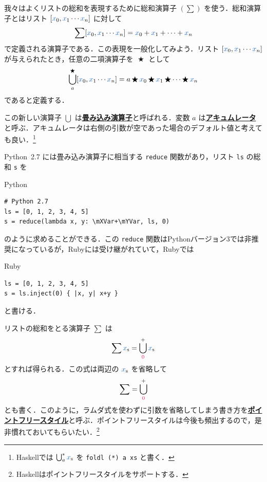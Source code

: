 \documentclass[a5paper,twoside,fleqn,draft]{jsbook}
\def\constantColor{WildStrawberry}
\def\varColor{NavyBlue}
\newcommand{\programminglanguage}[1]{\textsf{#1}}
\newcommand{\haskell}{\programminglanguage{Haskell}}
\newcommand{\python}{\programminglanguage{Python}}
\newcommand{\ruby}{\programminglanguage{Ruby}}
\newcommand{\keyword}[1]{{\underline{\textbf{#1}}}}
\newcommand{\code}[1]{\texttt{#1}}
\newenvironment{pythoncode}{\begin{itembox}[r]{\python}}{\end{itembox}}
\newenvironment{rubycode}{\begin{itembox}[r]{\ruby}}{\end{itembox}}
\newcommand{\mConstant}[1]{\textcolor{\constantColor}{#1}}
\newcommand{\mZeroNumber}{{\mConstant{0}}}
\newcommand{\mVar}[1]{\textcolor{\varColor}{#1}}
\newcommand{\mXVar}{\mVar{x}}
\newcommand{\mYVar}{\mVar{y}}
\DeclareMathOperator{\mBinOp}{\bigstar}
\DeclareMathOperator*{\mFold}{\bigcup}
\newcommand{\mList}[1]{\mVar{#1}_\mathrm{s}}
\begin{document}
我々はよくリストの総和を表現するために総和演算子 $(\sum)$ を使う．総和演算子とはリスト $[\mXVar_0,\mXVar_1\dotsb\mXVar_n]$ に対して
\begin{equation}
  \sum[\mXVar_0,\mXVar_1\dotsb \mXVar_n]
  =\mXVar_0+\mXVar_1+\dotsb+\mXVar_n
\end{equation}
で定義される演算子である．この表現を一般化してみよう．リスト $[\mXVar_0,\mXVar_1\dotsb \mXVar_n]$ が与えられたとき，任意の二項演算子を $\mBinOp$ として
\begin{equation}
  \mFold^{\mBinOp}_a[\mXVar_0,\mXVar_1\dotsb \mXVar_n]
  =a\mBinOp \mXVar_0\mBinOp \mXVar_1\mBinOp\dotsb\mBinOp \mXVar_n
\end{equation}
であると定義する．

この新しい演算子 $\mFold$ は\keyword{畳み込み演算子}と呼ばれる．変数 $a$ は\keyword{アキュムレータ}と呼ぶ．アキュムレータは右側の引数が空であった場合のデフォルト値と考えても良い．\footnote{\haskell では $\mFold^*_a\mList{x}$ を \code{foldl (*) a xs} と書く．}

\python\ 2.7 には畳み込み演算子に相当する \code{reduce} 関数があり，リスト \code{ls} の総和 \code{s} を
\begin{pythoncode}
\begin{verbatim}
# Python 2.7
ls = [0, 1, 2, 3, 4, 5]
s = reduce(lambda x, y: \mXVar+\mYVar, ls, 0)
\end{verbatim}
\end{pythoncode}
のように求めることができる．この \code{reduce} 関数は\python バージョン3では非推奨になっているが，\ruby には受け継がれていて，\ruby では
\begin{rubycode}
\begin{verbatim}
ls = [0, 1, 2, 3, 4, 5]
s = ls.inject(0) { |x, y| x+y }
\end{verbatim}
\end{rubycode}
と書ける．

リストの総和をとる演算子 $\sum$ は
\begin{equation}
  \sum\mList{x}
  =\mFold^+_\mZeroNumber\mList{x}
\end{equation}
とすれば得られる．この式は両辺の $\mList{x}$ を省略して
\begin{equation}
  \sum
  =\mFold^+_\mZeroNumber
\end{equation}
とも書く．このように，ラムダ式を使わずに引数を省略してしまう書き方を\keyword{ポイントフリースタイル}と呼ぶ．ポイントフリースタイルは今後も頻出するので，是非慣れておいてもらいたい．\footnote{\haskell はポイントフリースタイルをサポートする．}
\end{document}
